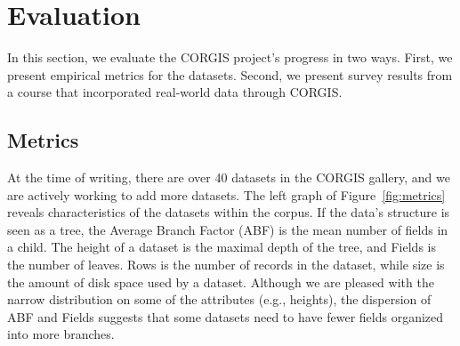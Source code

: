 \documentclass{sig-alternate}
\begin{document}
\section{Evaluation}

In this section, we evaluate the CORGIS project's progress in two ways.
First, we present empirical metrics for the datasets.
Second, we present survey results from a course that incorporated real-world data through CORGIS.

\subsection{Metrics}
\label{sec:structure-metrics}

At the time of writing, there are over 40 datasets in the CORGIS gallery, and we are actively working to add more datasets.
The left graph of Figure~\ref{fig:metrics} reveals characteristics of the datasets within the corpus.
If the data's structure is seen as a tree, the Average Branch Factor (ABF) is the mean number of fields in a child.
The height of a dataset is the maximal depth of the tree, and Fields is the number of leaves.
Rows is the number of records in the dataset, while size is the amount of disk space used by a dataset.
Although we are pleased with the narrow distribution on some of the attributes (e.g., heights), the dispersion of ABF and Fields suggests that some datasets need to have fewer fields organized into more branches.
\end{document}
